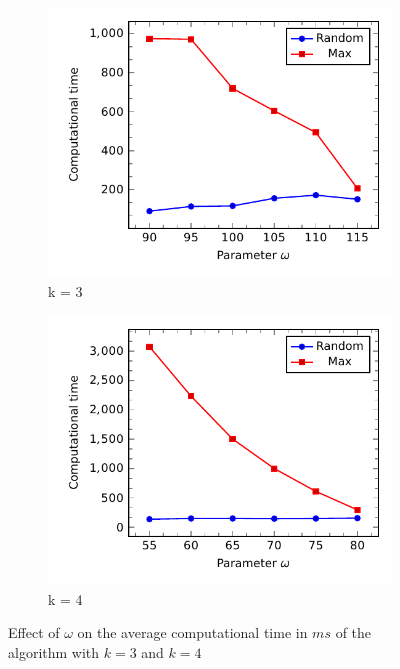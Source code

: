 %
\begin{figure}[h]
	\begin{subfigure}[t]{.5\textwidth}
		\centering
		\includegraphics[scale=.8]{Hinhanh/OmegaEffect/time/k3.pdf}		
		\caption{k = 3}
	\end{subfigure}
	\begin{subfigure}[t]{.5\textwidth}
		\centering
		\includegraphics[scale=.8]{Hinhanh/OmegaEffect/time/k4.pdf}		
		\caption{k = 4}
	\end{subfigure}
\caption{Effect of $\omega$ on the average computational time in $ms$ of the algorithm with $k = 3$ and $k = 4$}
\label{fig:}
\end{figure}
